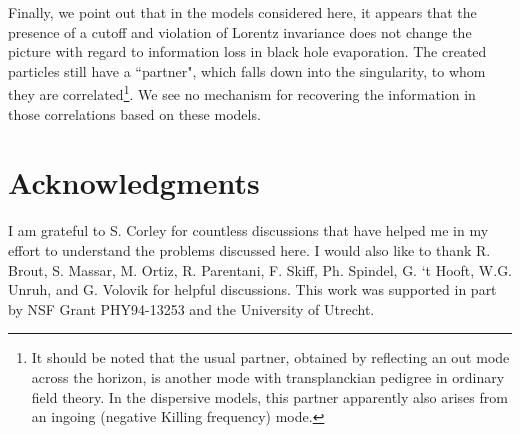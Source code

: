 Finally, we point out that in the models considered here, it appears
that the presence of a cutoff and violation of Lorentz invariance does
not change the picture with regard to information loss in black hole
evaporation. The created particles still have a ``partner"\cite{BMPS},
which falls down into the singularity, to whom they are
correlated\footnote{It should be noted that the usual partner,
obtained\cite{Unruh-notes} by reflecting an out mode across the
horizon, is another mode with transplanckian pedigree in ordinary field
theory.  In the dispersive models, this partner apparently\cite{BMPS}
also arises from an ingoing (negative Killing frequency) mode.}.  We
see no mechanism for recovering the information in those correlations
based on these models.

\section{Acknowledgments} 
I am grateful to S. Corley for countless
discussions that have helped me in my effort to understand the problems
discussed here. I would also like to thank R. Brout, S. Massar, M.
Ortiz, R. Parentani, F. Skiff, Ph. Spindel, G. `t Hooft, W.G. Unruh,
and G. Volovik
for helpful discussions. This work was supported in part by NSF Grant
PHY94-13253 and the University of Utrecht.

